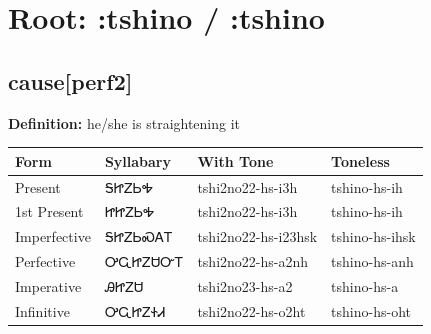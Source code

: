 \documentclass{article}%
\begin{document}
%
\normalsize%
\section*{Root: :tshino / :tshino}%
\subsection*{cause[perf2]}%
\textbf{Definition: }%
he/she is straightening it%
\\[0.5em]%
\begin{tabular}{|l|l|l|l|}%
\hline%
\textbf{Form}&\textbf{Syllabary}&\textbf{With Tone}&\textbf{Toneless}\\%
\hline%
Present&ᎦᏥᏃᏏᎭ&tshi2no22{-}hs{-}i3h&tshino{-}hs{-}ih\\%
1st Present&ᏥᏥᏃᏏᎭ&tshi2no22{-}hs{-}i3h&tshino{-}hs{-}ih\\%
Imperfective&ᎦᏥᏃᏏᏍᎪᎢ&tshi2no22{-}hs{-}i23hsk&tshino{-}hs{-}ihsk\\%
Perfective&ᎤᏩᏥᏃᏌᏅᎢ&tshi2no22{-}hs{-}a2nh&tshino{-}hs{-}anh\\%
Imperative&ᎯᏥᏃᏌ&tshi2no23{-}hs{-}a2&tshino{-}hs{-}a\\%
Infinitive&ᎤᏩᏥᏃᏐᏗ&tshi2no22{-}hs{-}o2ht&tshino{-}hs{-}oht\\%
\hline%
\end{tabular}%
\\[1em]%
\end{document}
